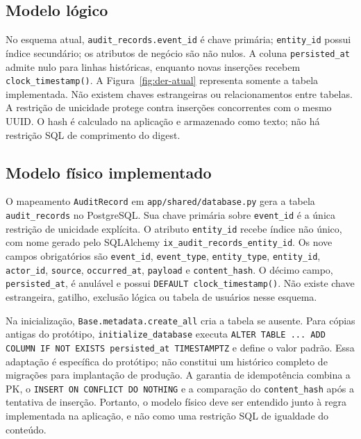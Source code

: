 \subsection{Modelo lógico}
No esquema atual, \texttt{audit\_records.event\_id} é chave primária; \texttt{entity\_id} possui índice secundário; os atributos de negócio são não nulos. A coluna \texttt{persisted\_at} admite nulo para linhas históricas, enquanto novas inserções recebem \texttt{clock\_timestamp()}. A Figura~\ref{fig:der-atual} representa somente a tabela implementada. Não existem chaves estrangeiras ou relacionamentos entre tabelas. A restrição de unicidade protege contra inserções concorrentes com o mesmo UUID. O hash é calculado na aplicação e armazenado como texto; não há restrição SQL de comprimento do digest.


\subsection{Modelo físico implementado}
O mapeamento \texttt{AuditRecord} em \texttt{app/shared/database.py} gera a tabela \texttt{audit\_records} no PostgreSQL. Sua chave primária sobre \texttt{event\_id} é a única restrição de unicidade explícita. O atributo \texttt{entity\_id} recebe índice não único, com nome gerado pelo SQLAlchemy \texttt{ix\_audit\_records\_entity\_id}. Os nove campos obrigatórios são \texttt{event\_id}, \texttt{event\_type}, \texttt{entity\_type}, \texttt{entity\_id}, \texttt{actor\_id}, \texttt{source}, \texttt{occurred\_at}, \texttt{payload} e \texttt{content\_hash}. O décimo campo, \texttt{persisted\_at}, é anulável e possui \texttt{DEFAULT clock\_timestamp()}. Não existe chave estrangeira, gatilho, exclusão lógica ou tabela de usuários nesse esquema.

Na inicialização, \texttt{Base.metadata.create\_all} cria a tabela se ausente. Para cópias antigas do protótipo, \texttt{initialize\_database} executa \texttt{ALTER TABLE ... ADD COLUMN IF NOT EXISTS persisted\_at TIMESTAMPTZ} e define o valor padrão. Essa adaptação é específica do protótipo; não constitui um histórico completo de migrações para implantação de produção. A garantia de idempotência combina a PK, o \texttt{INSERT ON CONFLICT DO NOTHING} e a comparação do \texttt{content\_hash} após a tentativa de inserção. Portanto, o modelo físico deve ser entendido junto à regra implementada na aplicação, e não como uma restrição SQL de igualdade do conteúdo.

